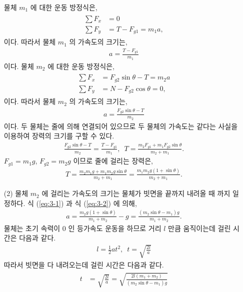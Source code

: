\documentclass[fleqn,10pt]{article}%
\begin{document}
\begin{itemize}
  물체 $m_1$ 에 대한 운동 방정식은,
  \begin{align}
    \begin{split}
      \sum F_x &= 0  \\
      \sum F_y &= T-F_{g1} = m_1 a,
    \end{split}
  \end{align}
  이다. 따라서 물체 $m_1$ 의 가속도의 크기는,
  \begin{align}\label{eq:3-1}
  a=\frac{T-F_{g1}}{m_1}  
  \end{align} 
  이다.
  물체 $m_2$ 에 대한 운동 방정식은,
  \begin{align}
    \begin{split}
      \sum F_x &= F_{g2}\sin{\theta}-T=m_2a  \\
      \sum F_y &= N - F_{g2}\cos{\theta} = 0,
    \end{split}
  \end{align}
  이다. 따라서 물체 $m_2$ 의 가속도의 크기는,
  \begin{align}
    a=\frac{F_{g2}\sin{\theta}-T}{m_2}  
  \end{align}
  이다. 두 물체는 줄에 의해 연결되어 있으므로 두 물체의 가속도는 같다는 사실을 이용하여 
  장력의 크기를 구할 수 있다.
  \begin{align}
    \frac{F_{g2}\sin{\theta}-T}{m_2} =\frac{T-F_{g1}}{m_1},\,\,\,
    T = \frac{m_2 F_{g1}+m_1 F_{g2}\sin{\theta}}{m_2+m_1}.
  \end{align}
  $F_{g1}=m_1g$, $F_{g2}=m_2g$ 이므로 줄에 걸리는 장력은,
  \begin{align}\label{eq:3-2}
    T = \frac{m_2 m_1g+m_1 m_2g\sin{\theta}}{m_2+m_1} 
    =\frac{m_1 m_2 g(1+\sin{\theta})}{m_2+m_1}.
  \end{align}
  \item[(2)] 물체 $m_2$ 에 걸리는 가속도의 크기는 물체가 빗면을 끝까지 내려올 때 까지 
  일정하다. 식 (\ref{eq:3-1}) 과 식 (\ref{eq:3-2}) 에 의해,
  \begin{align}
  a=   \frac{m_2g(1+\sin{\theta})}{m_1+m_2}-g
  =\frac{(m_2\sin{\theta}-m_1)g}{m_1+m_2}.  
  \end{align}
  물체는 초기 속력이 0 인 등가속도 운동을 하므로 거리 $l$ 만큼 움직이는데 걸린 시간은 
  다음과 같다.
  \begin{align}
    l=\frac{1}{2}at^2,\,\,\,t= \sqrt{\frac{2l}{a}}
  \end{align}
  따라서 빗면을 다 내려오는데 걸린 시간은 다음과 같다.
  \begin{align}
    \begin{split}
      t&=\sqrt{\frac{2l}{a}}
      =\sqrt{\frac{2l(m_1+m_2)}{(m_2\sin{\theta}-m_1)g}} 
    \end{split}
  \end{align}
\end{itemize}
 
\newpage

\end{document}
